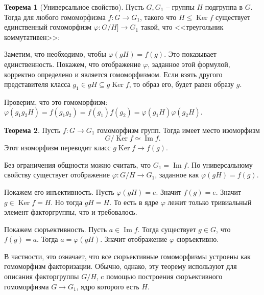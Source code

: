 \documentclass[10pt,a4paper,oneside]{book}
\theoremstyle{definition}
\newtheorem{thm}{\color{red!40!black}Теорема}
\renewcommand{\leq}{\leqslant}
\DeclareMathOperator{\Ker}{Ker}
\renewcommand{\Im}{\operatorname{Im}}
\def\ffi{\varphi}
\def\thrm{\begin{thm}}
\def\ethrm{\end{thm}}
\begin{document}
\thrm[Универсальное свойство] Пусть $G,G_1$ -- группы $H$ подгруппа в $G$. Тогда для любого гомоморфизма $f \colon G\to G_1$, такого что $ H \leq \Ker f$ существует единственный гомоморфизм $\ffi\colon G/H ] \to G_1$ такой, что <<треугольник коммутативен>>:
\begin{center}
\end{center}
\proof Заметим, что необходимо, чтобы $\ffi(gH)=f(g)$. Это показывает единственность. Покажем, что отображение $\ffi$, заданное этой формулой, корректно определено и является гомоморфизмом. Если взять другого представителя класса $g_1\in gH\subseteq g \Ker f $, то образ его, будет равен образу $g$.

Проверим, что это гомоморфизм: $\ffi(g_1g_2H)=f(g_1g_2)=f(g_1)f(g_2)=\ffi(g_1H)\ffi(g_2H).$
\endproof
\ethrm

\thrm Пусть $f\colon G \to G_1$ гомоморфизм групп. Тогда имеет место изоморфизм 
$$G/\Ker f \simeq \Im f.$$
Этот изоморфизм переводит класс $g \Ker f \to f(g)$. 
\ethrm
\proof Без ограничения общности можно считать, что $G_1=\Im f$. По универсальному свойству существует отображение $\ffi : G/H \to G_1$, заданное как $\ffi(gH)=f(g)$.

Покажем его инъективность. Пусть $\ffi(gH)=e$. Значит $f(g)=e$. Значит $g\in \Ker f=H$. Но тогда $gH=H$. То есть в ядре $\ffi$ лежит только тривиальный элемент факторгруппы, что  и требовалось.

Покажем сюръективность. Пусть $a\in \Im f$. Тогда существует $g\in G$, что $f(g)=a$. Тогда $a=\ffi(gH)$. Значит отображение $\ffi$ сюръективно.
\endproof

В частности, это означает, что все сюръективные гомоморфизмы устроены как гомоморфизм факторизации. Обычно, однако, эту теорему используют для описания факторгруппы $G/H$, c помощью построения сюръективного гомоморфизма $G \to G_1$, ядро которого есть $H$. 
\end{document}

